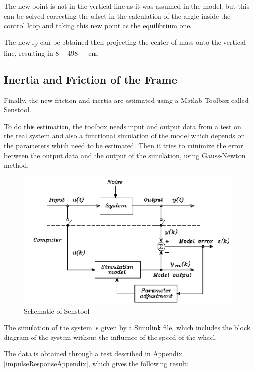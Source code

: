 The new point is not in the vertical line as it was assumed in the model, but this can be solved correcting the offset in the calculation of the angle inside the control loop and taking this new point as the equilibrium one. 

The new \si{l_F} can be obtained then projecting the center of mass onto the vertical line, resulting in \si{8,498\ cm}.

\subsection{Inertia and Friction of the Frame}
Finally, the new friction and inertia are estimated using a Matlab Toolbox called Senstool. .

To do this estimation, the toolbox needs input and output data from a test on the real system and also a functional simulation of the model which depends on the parameters which need to be estimated. Then it tries to minimize the error between the output data and the output of the simulation, using Gauss-Newton method.

\begin{figure}[H]
	\centering
	\includegraphics[scale=0.4]{figures/SensToolSchema}
	\caption{Schematic of Senstool}
	\label{SensToolSchema}
\end{figure}
The simulation of the system is given by a Simulink file, which includes the block diagram of the system without the influence of the speed of the wheel.

The data is obtained through a test described in Appendix \ref{impulseResponseAppendix}, which gives the following result:

